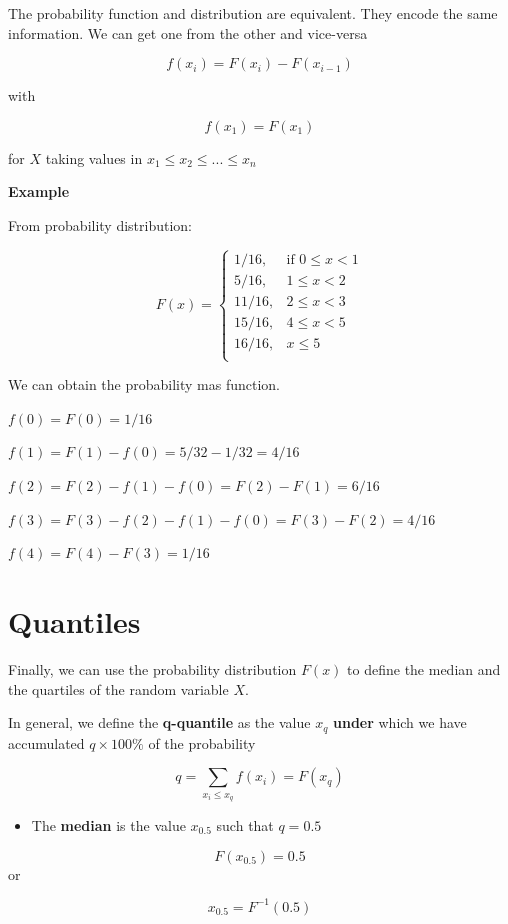 \documentclass[
]{book}
\providecommand{\tightlist}{%
  \setlength{\itemsep}{0pt}\setlength{\parskip}{0pt}}
\begin{document}
The probability function and distribution are equivalent. They encode the same information. We can get one from the other and vice-versa

\[f(x_i)=F(x_i)-F(x_{i-1})\]

with

\[f(x_1)=F(x_1)\]

for \(X\) taking values in \(x_1 \leq x_2 \leq ... \leq x_n\)

\textbf{Example}

From probability distribution:

\[
    F(x)=
\begin{cases}
    1/16,& \text{if } 0 \leq x < 1\\
    5/16,& 1\leq x < 2\\
    11/16,& 2\leq x < 3\\
    15/16,& 4\leq x < 5\\
    16/16,&  x \leq 5\\
\end{cases}
\]

We can obtain the probability mas function.

\(f(0)=F(0)=1/16\)

\(f(1)=F(1)-f(0)=5/32-1/32=4/16\)

\(f(2)=F(2)-f(1)-f(0)=F(2)-F(1)=6/16\)

\(f(3)=F(3)-f(2)-f(1)-f(0)=F(3)-F(2)=4/16\)

\(f(4)=F(4)-F(3)=1/16\)

\hypertarget{quantiles}{%
\section{Quantiles}\label{quantiles}}

Finally, we can use the probability distribution \(F(x)\) to define the median and the quartiles of the random variable \(X\).

In general, we define the \textbf{q-quantile} as the value \(x_{q}\) \textbf{under} which we have accumulated \(q\times 100\%\) of the probability

\[q=\sum_{x_i\leq x_q} f(x_i) = F (x_q)\]

\begin{itemize}
\tightlist
\item
  The \textbf{median} is the value \(x_{0.5}\) such that \(q=0.5\)
\end{itemize}

\[F(x_{0.5})=0.5\]
or

\[x_{0.5}=F^{-1}(0.5)\]
\end{document}
